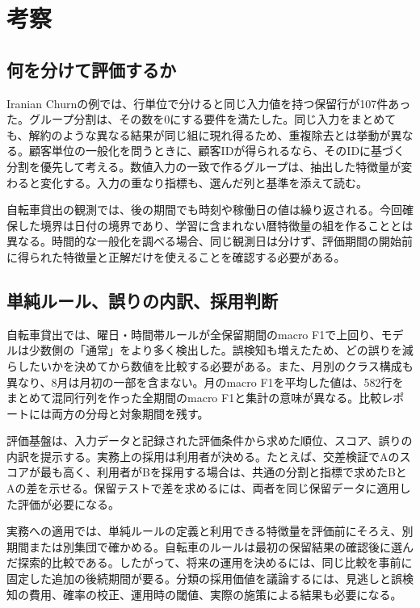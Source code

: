 \section{考察}\label{sec:discussion}

\subsection{何を分けて評価するか}

Iranian Churnの例では、行単位で分けると同じ入力値を持つ保留行が107件あった。グループ分割は、その数を0にする要件を満たした。同じ入力をまとめても、解約のような異なる結果が同じ組に現れ得るため、重複除去とは挙動が異なる。顧客単位の一般化を問うときに、顧客IDが得られるなら、そのIDに基づく分割を優先して考える。数値入力の一致で作るグループは、抽出した特徴量が変わると変化する。入力の重なり指標も、選んだ列と基準を添えて読む。

自転車貸出の観測では、後の期間でも時刻や稼働日の値は繰り返される。今回確保した境界は日付の境界であり、学習に含まれない暦特徴量の組を作ることとは異なる。時間的な一般化を調べる場合、同じ観測日は分けず、評価期間の開始前に得られた特徴量と正解だけを使えることを確認する必要がある。

\subsection{単純ルール、誤りの内訳、採用判断}

自転車貸出では、曜日・時間帯ルールが全保留期間のmacro F1で上回り、モデルは少数側の「通常」をより多く検出した。誤検知も増えたため、どの誤りを減らしたいかを決めてから数値を比較する必要がある。また、月別のクラス構成も異なり、8月は月初の一部を含まない。月のmacro F1を平均した値は、582行をまとめて混同行列を作った全期間のmacro F1と集計の意味が異なる。比較レポートには両方の分母と対象期間を残す。

評価基盤は、入力データと記録された評価条件から求めた順位、スコア、誤りの内訳を提示する。実務上の採用は利用者が決める。たとえば、交差検証でAのスコアが最も高く、利用者がBを採用する場合は、共通の分割と指標で求めたBとAの差を示せる。保留テストで差を求めるには、両者を同じ保留データに適用した評価が必要になる。

実務への適用では、単純ルールの定義と利用できる特徴量を評価前にそろえ、別期間または別集団で確かめる。自転車のルールは最初の保留結果の確認後に選んだ探索的比較である。したがって、将来の運用を決めるには、同じ比較を事前に固定した追加の後続期間が要る。分類の採用価値を議論するには、見逃しと誤検知の費用、確率の校正、運用時の閾値、実際の施策による結果も必要になる。

